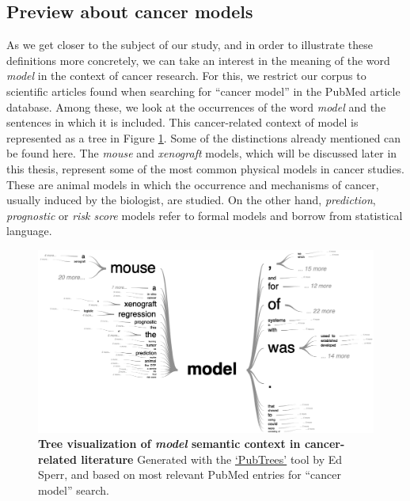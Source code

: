 \documentclass[a4paper,12pt,twoside,onecolumn,openright,final,oldfontcommands]{memoir}
\begin{document}
\subsection{Preview about cancer
models}\label{preview-about-cancer-models}

As we get closer to the subject of our study, and in order to illustrate
these definitions more concretely, we can take an interest in the
meaning of the word \emph{model} in the context of cancer research. For
this, we restrict our corpus to scientific articles found when searching
for ``cancer model'' in the PubMed article database. Among these, we
look at the occurrences of the word \emph{model} and the sentences in
which it is included. This cancer-related context of model is
represented as a tree in Figure \ref{fig:pubmed-tree}. Some of the
distinctions already mentioned can be found here. The \emph{mouse} and
\emph{xenograft} models, which will be discussed later in this thesis,
represent some of the most common physical models in cancer studies.
These are animal models in which the occurrence and mechanisms of
cancer, usually induced by the biologist, are studied. On the other
hand, \emph{prediction}, \emph{prognostic} or \emph{risk score} models
refer to formal models and borrow from statistical language.

\begin{figure}

{\centering \includegraphics[width=0.9\linewidth]{fig/pubmed-tree} 

}

\caption[Tree visualization of *model* semantic context in cancer-related literature]{\textbf{Tree visualization of \emph{model}
semantic context in cancer-related literature} Generated with the
\href{https://esperr.github.io/pub-trees/}{`PubTrees'} tool by Ed Sperr,
and based on most relevant PubMed entries for ``cancer model'' search.}\label{fig:pubmed-tree}
\end{figure}
\end{document}
